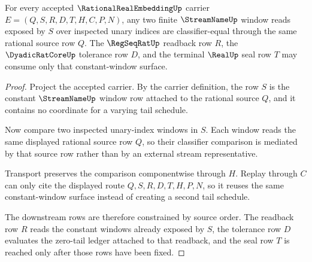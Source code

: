 \begin{theorem}
\label{thm:rational-real-embedding-constant-window-coherence}
For every accepted $\RationalRealEmbeddingUp$ carrier $E=(Q,S,R,D,T,H,C,P,N)$, any two finite $\StreamNameUp$ window reads exposed by $S$ over inspected unary indices are classifier-equal through the same rational source row $Q$. The $\RegSeqRatUp$ readback row $R$, the $\DyadicRatCoreUp$ tolerance row $D$, and the terminal $\RealUp$ seal row $T$ may consume only that constant-window surface.
\end{theorem}
\begin{proof}
Project the accepted carrier. By the carrier definition, the row $S$ is the constant $\StreamNameUp$ window row attached to the rational source $Q$, and it contains no coordinate for a varying tail schedule.

Now compare two inspected unary-index windows in $S$. Each window reads the same displayed rational source row $Q$, so their classifier comparison is mediated by that source row rather than by an external stream representative.

Transport preserves the comparison componentwise through $H$. Replay through $C$ can only cite the displayed route $Q,S,R,D,T,H,P,N$, so it reuses the same constant-window surface instead of creating a second tail schedule.

The downstream rows are therefore constrained by source order. The readback row $R$ reads the constant windows already exposed by $S$, the tolerance row $D$ evaluates the zero-tail ledger attached to that readback, and the seal row $T$ is reached only after those rows have been fixed.
\end{proof}

